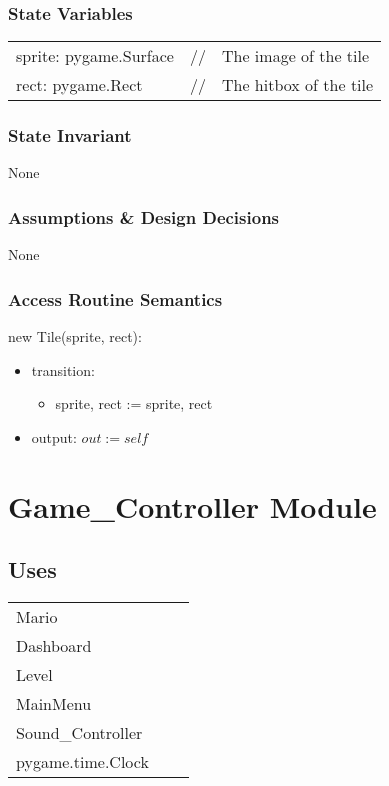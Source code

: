 \documentclass[12pt]{article}
\begin{document}
\subsubsection* {State Variables}
\begin{tabular}{lll}
sprite: pygame.Surface & // & The image of the tile\\
rect: pygame.Rect & // & The hitbox of the tile\\
\end{tabular}

\subsubsection* {State Invariant}

None

\subsubsection* {Assumptions \& Design Decisions}

None

\subsubsection* {Access Routine Semantics}

new Tile(sprite, rect):
\begin{itemize}
    \item transition: 
    \begin{itemize}[]
        \item sprite, rect := sprite, rect
    \end{itemize}
    \item output: $out := self$
\end{itemize}
        
\newpage

\section*{Game\_Controller Module}

\subsection* {Uses}

\begin{tabular}{lll}
    Mario & & \\
    Dashboard & & \\
    Level & & \\
    MainMenu & & \\
    Sound\_Controller & & \\
    pygame.time.Clock & & \\
\end{tabular}
\end{document}
